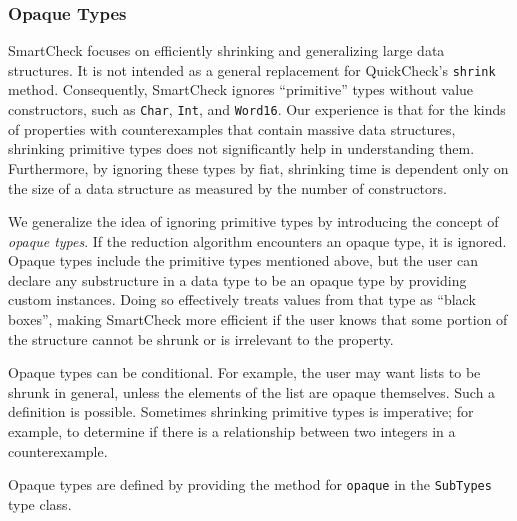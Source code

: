 \documentclass{sigplanconf}
\newcommand{\ttp}[1]{\texttt{#1}}
\begin{document}
\subsubsection{Opaque Types}\label{sec:base}

SmartCheck focuses on efficiently shrinking and generalizing large data
structures.  It is not intended as a general replacement for QuickCheck's
\ttp{shrink} method.  Consequently, SmartCheck ignores ``primitive'' types
without value constructors, such as \ttp{Char}, \ttp{Int}, and \ttp{Word16}.
Our experience is that for the kinds of properties with counterexamples that
contain massive data structures, shrinking primitive types does not
significantly help in understanding them.  Furthermore, by ignoring these types
by fiat, shrinking time is dependent only on the size of a data structure as
measured by the number of constructors.

We generalize the idea of ignoring primitive types by introducing the concept of
\emph{opaque types}.  If the reduction algorithm encounters an opaque type, it is
ignored.  Opaque types include the primitive types mentioned above, but the
user can declare any substructure in a data type to be an opaque type by
providing custom instances.  Doing so effectively treats values from that type
as ``black boxes'', making SmartCheck more efficient if the user knows that some
portion of the structure cannot be shrunk or is irrelevant to the property.

Opaque types can be conditional.  For example, the user may want lists to be
shrunk in general, unless the elements of the list are opaque themselves.  Such
a definition is possible.  Sometimes shrinking primitive types is imperative;
for example, to determine if there is a relationship between two integers in a
counterexample.

Opaque types are defined by providing the method for \ttp{opaque} in the
\ttp{SubTypes} type class.




\end{document}
